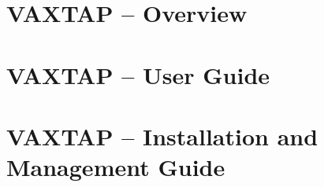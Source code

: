 
\setlongtables
\setcounter{secnumdepth}{1}
\setcounter{tocdepth}{2}



\setcounter{page}{1}
\part{VAXTAP -- Overview}

\part{VAXTAP -- User Guide}

\part{VAXTAP -- Installation and Management Guide}



